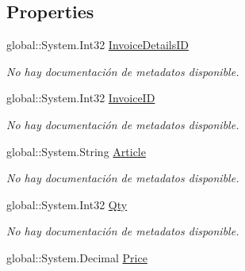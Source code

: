 \subsection*{Properties}
\begin{DoxyCompactItemize}
\item 
global\-::\-System.\-Int32 \hyperlink{class_microsoft_1_1_samples_1_1_kinect_1_1_basic_interactions_1_1_invoice_details_a52a44bda245904939074445505dbec39}{Invoice\-Details\-I\-D}
\begin{DoxyCompactList}\small\item\em No hay documentación de metadatos disponible. \end{DoxyCompactList}\item 
global\-::\-System.\-Int32 \hyperlink{class_microsoft_1_1_samples_1_1_kinect_1_1_basic_interactions_1_1_invoice_details_a9f4e034809f91670cb10627e0e76e0f6}{Invoice\-I\-D}
\begin{DoxyCompactList}\small\item\em No hay documentación de metadatos disponible. \end{DoxyCompactList}\item 
global\-::\-System.\-String \hyperlink{class_microsoft_1_1_samples_1_1_kinect_1_1_basic_interactions_1_1_invoice_details_a239b8297de5da5e67cbfe85fae139ed9}{Article}
\begin{DoxyCompactList}\small\item\em No hay documentación de metadatos disponible. \end{DoxyCompactList}\item 
global\-::\-System.\-Int32 \hyperlink{class_microsoft_1_1_samples_1_1_kinect_1_1_basic_interactions_1_1_invoice_details_a7274f4ee3ff1cd9b20cca4bb53b1c0d9}{Qty}
\begin{DoxyCompactList}\small\item\em No hay documentación de metadatos disponible. \end{DoxyCompactList}\item 
global\-::\-System.\-Decimal \hyperlink{class_microsoft_1_1_samples_1_1_kinect_1_1_basic_interactions_1_1_invoice_details_a4f5305dcaefdf4f6c5d3625a7ff1fbcd}{Price}

\end{DoxyCompactItemize}
